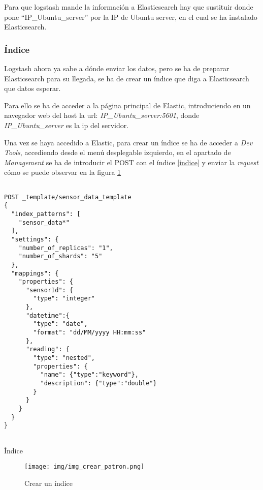Para que logstash mande la información a Elasticsearch hay que sustituir donde pone ``IP\_Ubuntu\_server'' por la IP de Ubuntu server, en el cual se ha instalado Elasticsearch.

\subsubsection{Índice}

Logstash ahora ya sabe a dónde enviar los datos, pero se ha de preparar Elasticsearch para su llegada, se ha de crear un índice que diga a Elasticsearch que datos esperar.

Para ello se ha de acceder a la página principal de Elastic, introduciendo en un navegador web del host la url: \textit{IP\_Ubuntu\_server:5601}, donde \textit{IP\_Ubuntu\_server} es la ip del servidor.

Una vez se haya accedido a Elastic, para crear un índice se ha de acceder a \textit{Dev Tools}, accediendo desde el menú desplegable izquierdo, en el apartado de \textit{Management} se ha de introducir el POST con el índice \ref{indice} y enviar la \textit{request} cómo se puede observar en la figura \ref{img_index}



\begin{listing}
\begin{verbatim}

POST _template/sensor_data_template
{
  "index_patterns": [
    "sensor_data*"
  ],
  "settings": {
    "number_of_replicas": "1",
    "number_of_shards": "5"
  },
  "mappings": {
    "properties": {
      "sensorId": {
        "type": "integer"
      },
      "datetime":{
        "type": "date",
        "format": "dd/MM/yyyy HH:mm:ss"
      },
      "reading": {
        "type": "nested", 
        "properties": { 
          "name": {"type":"keyword"},
          "description": {"type":"double"}
        }
      }
    }
  }
}


\end{verbatim}
\caption{Índice} 
\label{indice}
\end{listing}

\begin{figure}[h]
	\centering
	\texttt{[image: img/img\_crear\_patron.png]}
	\caption{Crear un índice}
	\label{img_index}
\end{figure}
\newpage

